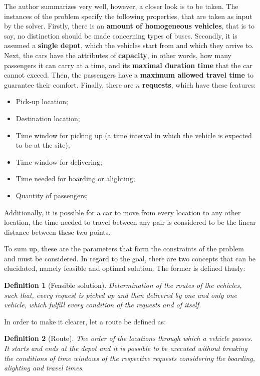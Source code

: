 \documentclass[tuberlin,cic,tc,openright,english,noabntcite,oneside]{iiufrgs}
\newtheorem{definition}{Definition}
\begin{document}
The author summarizes very well, however, a closer look is to be taken. The instances of the problem specify the following properties, that are taken as input by the solver. Firstly, there is an \textbf{amount of homogeneous vehicles}, that is to say, no distinction should be made concerning types of buses. Secondly, it is assumed a \textbf{single depot}, which the vehicles start from and which they arrive to. Next, the cars have the attributes of \textbf{capacity}, in other words, how many passengers it can carry at a time, and its \textbf{maximal duration time} that the car cannot exceed. Then, the passengers have a \textbf{maximum allowed travel time} to guarantee their comfort. Finally, there are $n$ \textbf{requests}, which have these features:

\begin{itemize}
\item Pick-up location;
\item Destination location;
\item Time window for picking up (a time interval in which the vehicle is expected to be at the site);
\item Time window for delivering;
\item Time needed for boarding or alighting;
\item Quantity of passengers;
\end{itemize}

Additionally, it is possible for a car to move from every location to any other location, the time needed to travel between any pair is considered to be the linear distance between these two points.

To sum up, these are the parameters that form the constraints of the problem and must be considered. In regard to the goal, there are two concepts that can be elucidated, namely feasible and optimal solution. The former is defined thusly:
\begin{definition}[Feasible solution]
Determination of the routes of the vehicles, such that, every request is picked up and then delivered by one and only one vehicle, which fulfill every condition of the requests and of itself.
\end{definition}

In order to make it clearer, let a route be defined as:
\begin{definition}[Route]
The order of the locations through which a vehicle passes. It starts and ends at the depot and it is possible to be executed without breaking the conditions of time windows of the respective requests considering the boarding, alighting and travel times.
\end{definition}
\end{document}
